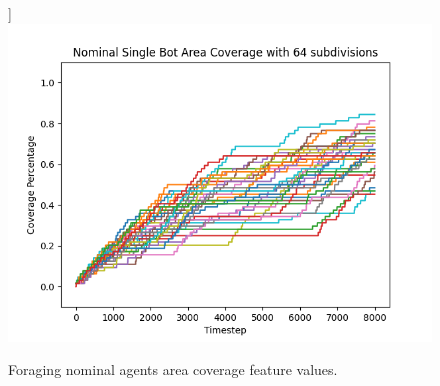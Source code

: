 \documentclass[../../Thesis.tex]{subfiles}
\begin{document}
\begin{figure}[H]
						\label{fig:foraging_nominal_64_subdivisions_area_coverage_feature}]{
						\includegraphics[scale=0.22]{../../Images/Experiments/foraging_size6x8_bot_number38_fault_10_percent_rotating_fault_after_1000/Nominal_Single_Bot_Area_Coverage_with_64_subdivisions.png}
					}
					\thinspace
					\caption{Foraging nominal agents area coverage feature values.}
					\label{fig:foraging_nominal_agents_area_coverage}
				\end{figure}
			
\end{document}
